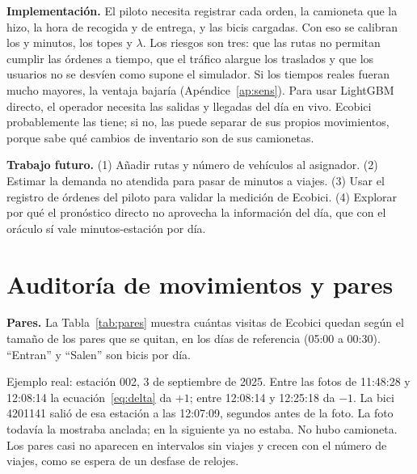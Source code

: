 \documentclass[conference,letterpaper,10pt]{IEEEtran}
\begin{document}
\textbf{Implementación.} El piloto necesita registrar cada orden, la camioneta que la hizo, la hora de recogida y de entrega, y las bicis cargadas. Con eso se calibran los \rpickMin{} y \rtransMin{} minutos, los topes y $\lambda$. Los riesgos son tres: que las rutas no permitan cumplir las órdenes a tiempo, que el tráfico alargue los traslados y que los usuarios no se desvíen como supone el simulador. Si los tiempos reales fueran mucho mayores, la ventaja bajaría (Apéndice~\ref{ap:sens}). Para usar LightGBM directo, el operador necesita las salidas y llegadas del día en vivo. Ecobici probablemente las tiene; si no, las puede separar de sus propios movimientos, porque sabe qué cambios de inventario son de sus camionetas.

\textbf{Trabajo futuro.} (1) Añadir rutas y número de vehículos al asignador. (2) Estimar la demanda no atendida para pasar de minutos a viajes. (3) Usar el registro de órdenes del piloto para validar la medición de Ecobici. (4) Explorar por qué el pronóstico directo no aprovecha la información del día, que con el oráculo sí vale \roracleDirectGap{} minutos-estación por día.

\clearpage
\sloppy



\clearpage
\appendices
\section{Auditoría de movimientos y pares}\label{ap:auditoria}
\textbf{Pares.} La Tabla~\ref{tab:pares} muestra cuántas visitas de Ecobici quedan según el tamaño de los pares que se quitan, en los \rrefDias{} días de referencia (05:00 a 00:30). ``Entran'' y ``Salen'' son bicis por día.

\begin{table}[h]
\centering\footnotesize
\setlength{\tabcolsep}{4pt}
\caption{Efecto de quitar pares que se deshacen. Media por día.}
\label{tab:pares}

\end{table}

Ejemplo real: estación 002, 3 de septiembre de 2025. Entre las fotos de 11:48:28 y 12:08:14 la ecuación~\eqref{eq:delta} da $+1$; entre 12:08:14 y 12:25:18 da $-1$. La bici 4201141 salió de esa estación a las 12:07:09, segundos antes de la foto. La foto todavía la mostraba anclada; en la siguiente ya no estaba. No hubo camioneta. Los pares casi no aparecen en intervalos sin viajes y crecen con el número de viajes, como se espera de un desfase de relojes.
\end{document}
